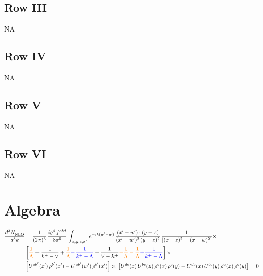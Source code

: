 \documentclass[9pt]{article}
\numberwithin{equation}{section}
\begin{document}
 \subsection{Row III}
 \textsc{NA}
\subsection{Row IV}
\textsc{NA}
\subsection{Row V}
\textsc{NA}
\subsection{Row VI}
\textsc{NA}
\section{Algebra}
\begin{align}
   \frac{d^{3}N_{\rm NLO}^{\rm}}{d^{3}k}  & = \frac{1}{(2\pi)^{3}}\,\frac{ig^{4}\,f^{abd}}{8\pi^{5}}\,\int_{x,y,z,x'}\, e^{-ik(w^\prime-w)}\,\frac{(x'-w')\cdot (y-z)}{(x'-w')^{2}\,(y-z)^{2}}\, \frac{1}{\left[(x-z)^{2}-(x-w)^{2}\right]}\times\,\notag \\ &  \left[{\color{orange}\frac{1}{\Lambda}}+\frac{1}{k^{+}-\vee}+{\color{orange}\frac{1}{\Lambda}}{\color{blue}-\frac{1}{k^{+}-\Lambda}}+\frac{1}{\vee - k^{+}}{\color{orange}-\frac{1}{\Lambda}-\frac{1}{\Lambda}}{\color{blue}+\frac{1}{k^{+}-\Lambda}}\right]\times\notag \\ & \left[U^{ab'}(x')\,\rho^{b'}(x')-U^{ab'}(w')\, \rho^{b'}(x')\right]\times\, \left[U^{de}(x)\,U^{bc}(z)\, \rho^{e}(x)\,\rho^{c}(y)-U^{de}(x)\,U^{bc}(y)\,\rho^{e}(x)\,\rho^{c}(y)\right]  = 0
\end{align}   
\end{document}
